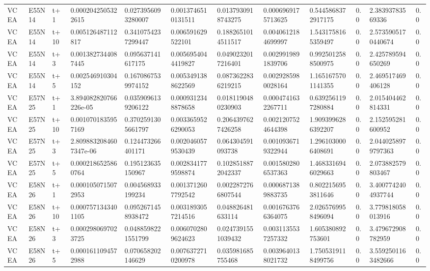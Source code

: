 \begin{landscape}
\begin{longtable}{llllllllllll}
VCEA & E55N14 & t+1 & 0.0002042505322615 & 0.0273956093280007 & 0.0013746510131511 & 0.0137930918743275 & 0.0006969175713625 & 0.5445868372917175 & 0.0 & 2.38393783569336 & 0.0 \\
VCEA & E55N14 & t+10 & 0.005126487112817 & 0.3410754237299447 & 0.006591629522101 & 0.1882651014511517 & 0.0040612184699997 & 1.5431758165359497 & 0.0 & 2.5735905170440674 & 0.0 \\
VCEA & E55N14 & t+3 & 0.0013827344087445 & 0.095637141617175 & 0.0056954044419827 & 0.0490232017216401 & 0.0029919891839706 & 0.9925012588500975 & 0.0 & 2.425789594650269 & 0.0 \\
VCEA & E55N14 & t+5 & 0.002546910304152 & 0.1670867539974152 & 0.0053491388622569 & 0.0873622836219215 & 0.0029285980028164 & 1.1651675701141355 & 0.0 & 2.469517469406128 & 0.0 \\
VCEA & E57N25 & t+1 & 3.894082820766226e-05 & 0.0359096139206122 & 0.0009312348878658 & 0.0181190480230903 & 0.0004741632267711 & 0.6392561197280884 & 0.0 & 2.015404462814331 & 0.0 \\
VCEA & E57N25 & t+10 & 0.0010701835957169 & 0.3702591305661797 & 0.0033659526290053 & 0.2064397627426258 & 0.0021207524644398 & 1.9093996286392207 & 0.0 & 2.152595281600952 & 0.0 \\
VCEA & E57N25 & t+3 & 2.8098832084607347e-06 & 0.124473266401171 & 0.0020460579530439 & 0.064304591093738 & 0.0010936719322944 & 1.2961030006408691 & 0.0 & 2.0440258979797363 & 0.0 \\
VCEA & E57N25 & t+5 & 0.0002186525860764 & 0.195123635150967 & 0.0028341779598874 & 0.1028518872042337 & 0.0015802806537363 & 1.4683316946029663 & 0.0 & 2.073882579803467 & 0.0 \\
VCEA & E58N26 & t+1 & 0.0001050715072953 & 0.004568933199234 & 0.0013712607792542 & 0.0022872766807544 & 0.0006871389883735 & 0.8022156953811646 & 0.0 & 3.4007742404937744 & 0.0 \\
VCEA & E58N26 & t+10 & 0.0007571343401105 & 0.0952671458938472 & 0.0031893057214516 & 0.048826481633114 & 0.0016763766364075 & 2.0265769958496094 & 0.0 & 3.779818058013916 & 0.0 \\
VCEA & E58N26 & t+3 & 0.0002980697023725 & 0.0488598221551799 & 0.0060702809624623 & 0.0247391551039432 & 0.0031135537257332 & 1.605380892753601 & 0.0 & 3.479672908782959 & 0.0 \\
VCEA & E58N26 & t+5 & 0.0001611094572988 & 0.070658202146629 & 0.0076372710200978 & 0.035981685755468 & 0.0039640138021732 & 1.7505319118499756 & 0.0 & 3.5592501163482666 & 0.0 \\
\bottomrule
\end{longtable}
\end{landscape}

